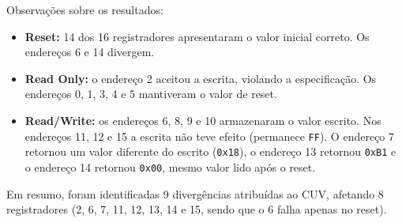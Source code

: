\documentclass[a4paper,11pt]{article}
\begin{document}
Observações sobre os resultados:
\begin{itemize}
    \item \textbf{Reset:} 14 dos 16 registradores apresentaram o valor inicial correto.
          Os endereços 6 e 14 divergem.
    \item \textbf{Read Only:} o endereço 2 aceitou a escrita, violando a especificação.
          Os endereços 0, 1, 3, 4 e 5 mantiveram o valor de reset.
    \item \textbf{Read/Write:} os endereços 6, 8, 9 e 10 armazenaram
          o valor escrito. Nos endereços 11, 12 e 15 a escrita não teve efeito (permanece \texttt{FF}).
          O endereço 7 retornou um valor diferente do escrito (\texttt{0x18}), o endereço 13 retornou
          \texttt{0xB1} e o endereço 14 retornou \texttt{0x00}, mesmo valor lido após o reset.
\end{itemize}

Em resumo, foram identificadas 9 divergências atribuídas ao CUV, afetando 8 registradores
(2, 6, 7, 11, 12, 13, 14 e 15, sendo que o 6 falha apenas no reset).
\end{document}
